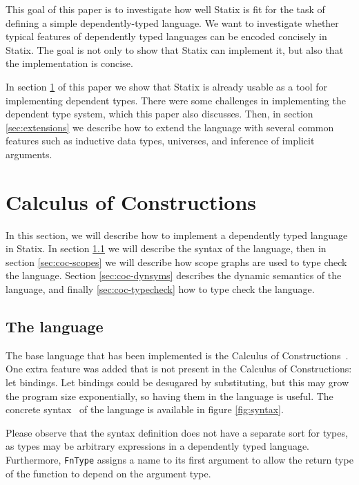 \documentclass[a4paper,UKenglish,cleveref, autoref, thm-restate]{oasics-v2021}
\begin{document}
This goal of this paper is to investigate how well Statix is fit for the task of defining a simple dependently-typed language. We want to investigate whether typical features of dependently typed languages can be encoded concisely in Statix. The goal is not only to show that Statix can implement it, but also that the implementation is concise.

In section \ref{sec:coc} of this paper we show that Statix is already usable as a tool for implementing dependent types. There were some challenges in implementing the dependent type system, which this paper also discusses. Then, in section \ref{sec:extensions} we describe how to extend the language with several common features such as inductive data types, universes, and inference of implicit arguments.

\section{Calculus of Constructions}
\label{sec:coc}

In this section, we will describe how to implement a dependently typed language in Statix. In section \ref{sec:coc-syntax} we will describe the syntax of the language, then in section \ref{sec:coc-scopes} we will describe how scope graphs are used to type check the language. Section \ref{sec:coc-dynsyms} describes the dynamic semantics of the language, and finally \ref{sec:coc-typecheck} how to type check the language. 

\subsection{The language}
\label{sec:coc-syntax}

The base language that has been implemented is the Calculus of Constructions~\cite{Coquand_Huet_1988}. One extra feature was added that is not present in the Calculus of Constructions: let bindings. Let bindings could be desugared by substituting, but this may grow the program size exponentially, so having them in the language is useful. The concrete syntax~\cite{sdf3} of the language is available in figure \ref{fig:syntax}.

Please observe that the syntax definition does not have a separate sort for types, as types may be arbitrary expressions in a dependently typed language. Furthermore, \verb|FnType| assigns a name to its first argument to allow the return type of the function to depend on the argument type.  
\end{document}
